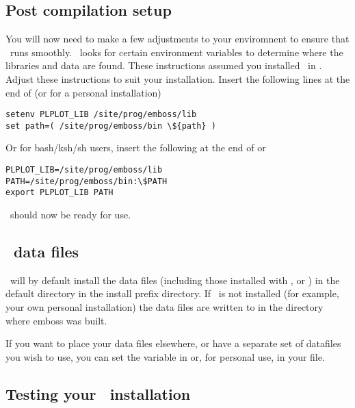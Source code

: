 \documentclass{report}
\begin{document}
\subsection{Post compilation setup}

You will now need to make a few adjustments to your enviromnent to
ensure that \EMBOSS\ runs smoothly.  \EMBOSS\ looks for certain
environment variables to determine where the libraries and data are
found. These instructions assumed you installed \EMBOSS\ in
. Adjust these instructions to suit your
installation.  Insert the following lines at the end of
 (or  for a personal
installation)

\begin{verbatim}
setenv PLPLOT_LIB /site/prog/emboss/lib
set path=( /site/prog/emboss/bin \${path} )
\end{verbatim}

Or for bash/ksh/sh users, insert the following at the end of
 or 

\begin{verbatim}
PLPLOT_LIB=/site/prog/emboss/lib
PATH=/site/prog/emboss/bin:\$PATH
export PLPLOT_LIB PATH
\end{verbatim}

\EMBOSS\ should now be ready for use.

\subsection{\EMBOSS\ data files}

\EMBOSS\ will by default install the data files (including those
installed with , 
  or
) in the default directory
 in the install prefix directory.  If
\EMBOSS\ is not installed (for example, your own personal
installation) the data files are written to  in
the directory where emboss was built.

If you want to place your data files elsewhere, or have a separate set
of datafiles you wish to use, you can set the 
variable in  or, for personal use, in your  file.

\subsection{Testing your \EMBOSS\ installation}
\end{document}
